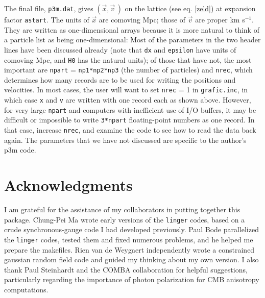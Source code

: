 The final file, {\tt p3m.dat}, gives $(\vec x,\vec v\,)$ on the lattice
(see eq. \ref{zeld}) at expansion factor {\tt astart}.  The units of
$\vec x$ are comoving Mpc; those of $\vec v$ are proper km s$^{-1}$.
They are written as one-dimensional arrays because it is more natural to
think of a particle list as being one-dimensional:
\hfil{}
Most of the parameters in the two header lines have been discussed already
(note that {\tt dx} and {\tt epsilon} have units of comoving Mpc, and
{\tt H0} has the natural units); of those that have not, the most
important are {\tt npart} = {\tt np1*np2*np3} (the number of particles)
and {\tt nrec}, which determines how many records are to be used for
writing the positions and velocities.  In most cases, the user will want
to set {\tt nrec} = 1 in {\tt grafic.inc}, in which case {\tt x} and
{\tt v} are written with one record each as shown above.  However, for
very large {\tt npart} and computers with inefficient use of I/O buffers,
it may be difficult or impossible to write {\tt 3*npart} floating-point
numbers as one record.  In that case, increase {\tt nrec}, and examine
the code to see how to read the data back again.  The parameters that
we have not discussed are specific to the author's p3m code.

\section*{Acknowledgments}

I am grateful for the assistance of my collaborators in putting together
this package.  Chung-Pei Ma wrote early versions of the {\tt linger} codes,
based on a crude synchronous-gauge code I had developed previously.
Paul Bode parallelized the {\tt linger} codes, tested them and fixed
numerous problems, and he helped me prepare the makefiles.
Rien van de Weygaert independently wrote a constrained gaussian random
field code and guided my thinking about my own version.  I also thank
Paul Steinhardt and the COMBA collaboration for helpful suggestions,
particularly regarding the importance of photon polarization for CMB
anisotropy computations.

